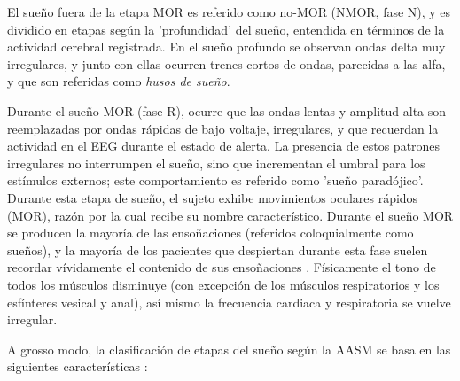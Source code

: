 El sueño fuera de la etapa MOR es referido como no-MOR (NMOR, fase N), y es dividido en etapas 
según la 'profundidad' del sueño, entendida en términos de la actividad cerebral registrada.
En el sueño profundo se observan ondas delta muy irregulares, y junto con ellas ocurren trenes 
cortos de ondas, parecidas a las alfa, y que son referidas como \textit{husos de sueño}. 

Durante el sueño MOR (fase R), ocurre que las ondas lentas y amplitud alta son reemplazadas por 
ondas rápidas de bajo voltaje, irregulares, y que recuerdan la actividad en el EEG durante el 
estado de alerta.
La presencia de estos patrones irregulares no interrumpen el sueño, sino que incrementan el 
umbral para los estímulos externos; este comportamiento es referido como 'sueño paradójico'.
Durante esta etapa de sueño, el sujeto exhibe movimientos oculares rápidos (MOR), razón por 
la cual recibe su nombre característico.
Durante el sueño MOR se producen la mayoría de las ensoñaciones (referidos coloquialmente 
como sueños), y la mayoría de los pacientes que despiertan durante esta fase suelen recordar 
vívidamente el contenido de sus ensoñaciones \cite{Chokroverty09}.
Físicamente el tono de todos los músculos disminuye (con excepción de los músculos 
respiratorios y los esfínteres vesical y anal), así mismo la frecuencia cardiaca y respiratoria 
se vuelve irregular.

A grosso modo, la clasificación de etapas del sueño según la AASM se basa en las siguientes
características \cite{Hori01}:

